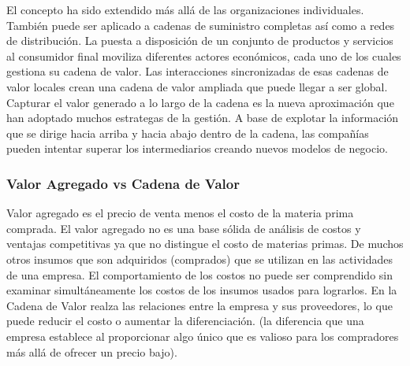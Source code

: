 El concepto ha sido extendido más allá de las organizaciones individuales. También puede ser aplicado a cadenas
de suministro completas así como a redes de distribución. La puesta a disposición de un conjunto de productos y
servicios al consumidor final moviliza diferentes actores económicos, cada uno de los cuales gestiona su cadena
de valor. Las interacciones sincronizadas de esas cadenas de valor locales crean una cadena de valor ampliada que
puede llegar a ser global. Capturar el valor generado a lo largo de la cadena es la nueva aproximación que han
adoptado muchos estrategas de la gestión. A base de explotar la información que se dirige hacia arriba y hacia
abajo dentro de la cadena, las compañías pueden intentar superar los intermediarios creando nuevos modelos de negocio.

\subsubsection*{Valor Agregado vs Cadena de Valor}
Valor agregado es el precio de venta menos el costo de la materia prima comprada.
El valor agregado no es una base sólida de análisis de costos y ventajas competitivas ya que no distingue el costo de materias primas.
De muchos otros insumos que son adquiridos (comprados) que se utilizan en las actividades de una empresa.
El comportamiento de los costos no puede ser comprendido sin examinar simultáneamente los costos de los insumos usados para lograrlos.
En la Cadena de Valor realza las relaciones entre la empresa y sus proveedores, lo que puede reducir el costo o aumentar la diferenciación.
(la diferencia que una empresa establece al proporcionar algo único que es valioso para los compradores más allá de ofrecer un precio bajo).


